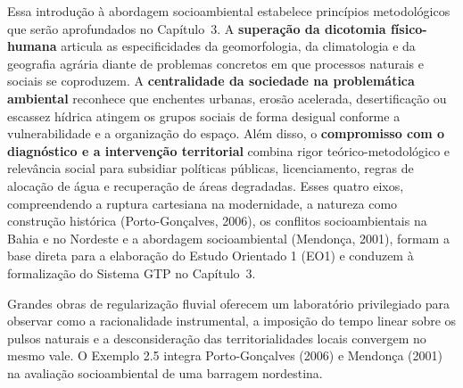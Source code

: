 Essa introdução à abordagem socioambiental estabelece princípios metodológicos que serão aprofundados no Capítulo~3. A \textbf{superação da dicotomia físico-humana} articula as especificidades da geomorfologia, da climatologia e da geografia agrária diante de problemas concretos em que processos naturais e sociais se coproduzem. A \textbf{centralidade da sociedade na problemática ambiental} reconhece que enchentes urbanas, erosão acelerada, desertificação ou escassez hídrica atingem os grupos sociais de forma desigual conforme a vulnerabilidade e a organização do espaço. Além disso, o \textbf{compromisso com o diagnóstico e a intervenção territorial} combina rigor teórico-metodológico e relevância social para subsidiar políticas públicas, licenciamento, regras de alocação de água e recuperação de áreas degradadas. Esses quatro eixos, compreendendo a ruptura cartesiana na modernidade, a natureza como construção histórica (Porto-Gonçalves, 2006), os conflitos socioambientais na Bahia e no Nordeste e a abordagem socioambiental (Mendonça, 2001), formam a base direta para a elaboração do Estudo Orientado 1 (EO1) e conduzem à formalização do Sistema GTP no Capítulo~3.


Grandes obras de regularização fluvial oferecem um laboratório privilegiado para observar como a racionalidade instrumental, a imposição do tempo linear sobre os pulsos naturais e a desconsideração das territorialidades locais convergem no mesmo vale. O Exemplo 2.5 integra Porto-Gonçalves (2006) e Mendonça (2001) na avaliação socioambiental de uma barragem nordestina.

